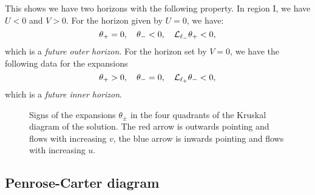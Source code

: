 This shows we have two horizons with the following property. In region I, we have $U < 0$ and $V > 0$. For the horizon given by $U = 0$, we have:
\begin{equation*}
	\theta_+ = 0, \quad \theta_- < 0, \quad {\cal L}_{\ell_-} \theta_+ < 0,
\end{equation*}
which is a \emph{future outer horizon}. For the horizon set by $V = 0$, we have the following data for the expansions
\begin{equation*}
	\theta_+ > 0, \quad \theta_- = 0, \quad {\cal L}_{\ell_+} \theta_- < 0,
\end{equation*}
which is a \emph{future inner horizon}.

\begin{figure}[!h]
\centering
{}
\caption[Signs of the expansions $\theta_\pm$ in the four quadrants of the Kruskal diagram for the Schwarzschild solution]{Signs of the expansions $\theta_\pm$ in the four quadrants of the Kruskal diagram of the \sch solution. The red arrow is outwards pointing and flows with increasing $v$, the blue arrow is inwards pointing and flows with increasing $u$.}
\label{fig:expansions}
\end{figure}

\subsection{Penrose-Carter diagram}

